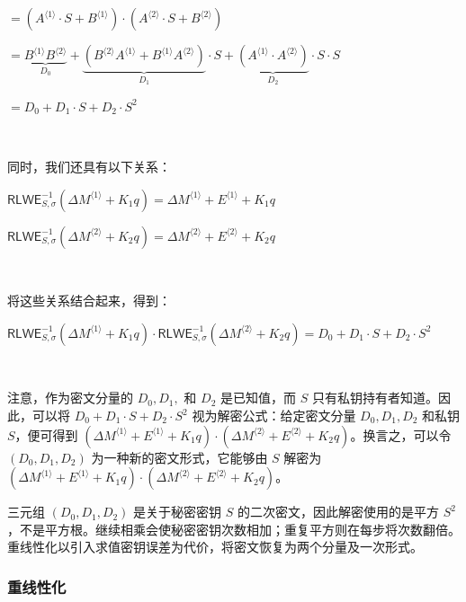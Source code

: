 $ = (A^{\langle 1 \rangle} \cdot S + B^{\langle 1 \rangle}) \cdot (A^{\langle 2 \rangle} \cdot S + B^{\langle 2 \rangle})$

$ = \underbrace{B^{\langle 1 \rangle}B^{\langle 2 \rangle}}_{D_0}  + \underbrace{(B^{\langle 2 \rangle}A^{\langle 1 \rangle} + B^{\langle 1 \rangle}A^{\langle 2 \rangle})}_{D_1} \cdot S + \underbrace{(A^{\langle 1 \rangle} \cdot A^{\langle 2 \rangle})}_{D_2} \cdot S \cdot S $



$= D_0 + D_1\cdot S + D_2\cdot S^2$



$ $

同时，我们还具有以下关系：

$\textsf{RLWE}_{S, \sigma}^{-1}(\Delta M^{\langle 1 \rangle} + K_1q) = \Delta M^{\langle 1 \rangle} + E^{\langle 1 \rangle} + K_1q$

$\textsf{RLWE}_{S, \sigma}^{-1}(\Delta M^{\langle 2 \rangle} + K_2q) = \Delta M^{\langle 2 \rangle} + E^{\langle 2 \rangle} + K_2q$

$ $

将这些关系结合起来，得到：

$\textsf{RLWE}_{S, \sigma}^{-1}(\Delta M^{\langle 1 \rangle} + K_1q) \cdot \textsf{RLWE}_{S, \sigma}^{-1}(\Delta M^{\langle 2 \rangle} + K_2q) = D_0 + D_1\cdot S + D_2\cdot S^2$

$ $

注意，作为密文分量的 $D_0, D_1,$ 和 $D_2$ 是已知值，而 $S$ 只有私钥持有者知道。因此，可以将 $D_0 + D_1\cdot S + D_2\cdot S^2$ 视为解密公式：给定密文分量 $D_0, D_1, D_2$ 和私钥 $S$，便可得到 $(\Delta M^{\langle 1 \rangle} + E^{\langle 1 \rangle} + K_1q) \cdot (\Delta M^{\langle 2 \rangle} + E^{\langle 2 \rangle} + K_2q)$。换言之，可以令 $(D_0, D_1, D_2)$ 为一种新的密文形式，它能够由 $S$ 解密为 $(\Delta M^{\langle 1 \rangle} + E^{\langle 1 \rangle} + K_1q) \cdot (\Delta M^{\langle 2 \rangle} + E^{\langle 2 \rangle} + K_2q)$。

三元组 $(D_0,D_1,D_2)$ 是关于秘密密钥 $S$ 的二次密文，因此解密使用的是平方 $S^2$，不是平方根。继续相乘会使秘密密钥次数相加；重复平方则在每步将次数翻倍。重线性化以引入求值密钥误差为代价，将密文恢复为两个分量及一次形式。



\subsubsection{重线性化}
\label{subsubsec:bfv-mult-cipher-relinearization}

